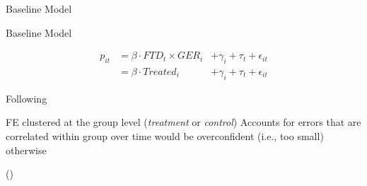 




\begin{frame}{Baseline Model}

\vspace{-0.7cm}

\begin{block}{Baseline Model}

\begin{equation}
\begin{aligned}
\label{eq:Base_DiD2}
p_{it} &= \beta \cdot FTD_{t} \times GER_{i} &+ \gamma_{i} + \tau_{t} + \epsilon_{it} \\
&= \beta \cdot Treated_{i} &+ \gamma_{i} + \tau_{t} + \epsilon_{it}
\end{aligned}
\end{equation}

\begin{tiny}
Following \textcite{Frondel2024}    
\end{tiny}

\end{block}



\begin{outline}
    \1 FE clustered at the group level (\textit{treatment} or \textit{control})
    \2 Accounts for errors that are correlated within group over time
    \2 would be overconfident (i.e., too small) otherwise
\end{outline}

\begin{center}
(\cite{Huntington2022})   
\end{center}




\end{frame}











